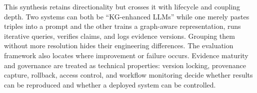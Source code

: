 This synthesis retains directionality but crosses it with lifecycle and coupling depth. Two systems can both be ``KG-enhanced LLMs'' while one merely pastes triples into a prompt and the other trains a graph-aware representation, runs iterative queries, verifies claims, and logs evidence versions. Grouping them without more resolution hides their engineering differences. The evaluation framework also locates where improvement or failure occurs. Evidence maturity and governance are treated as technical properties: version locking, provenance capture, rollback, access control, and workflow monitoring decide whether results can be reproduced and whether a deployed system can be controlled.
